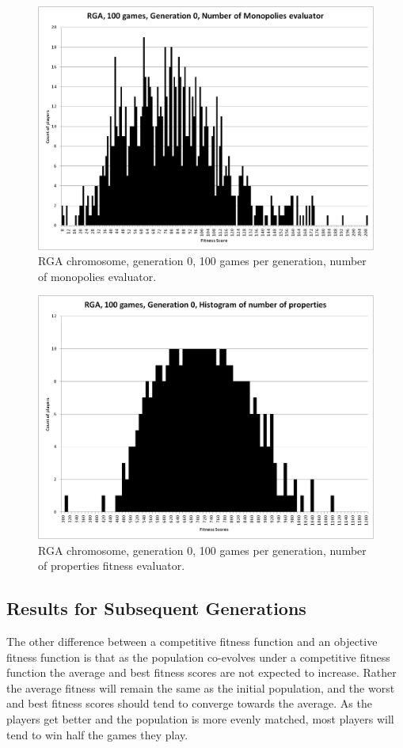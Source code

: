 \begin{figure}[htbp]
\centerline{\includegraphics[width=0.75\columnwidth]{Figures/RGA_1024_G000_N100_NM.png}}
\caption[RGA Fitness Distribution, Initial Generation]{RGA chromosome,
generation 0, 100 games per generation, number of monopolies evaluator.}
\label{figure-RGA-G000-N100-NM-initial_fitness}
\end{figure}

\begin{figure}[htbp]
\centerline{\includegraphics[width=0.75\columnwidth]{Figures/RGA_1024_G000_N100_NP.png}}
\caption[RGA Fitness Distribution, Initial Generation]{RGA chromosome,
generation 0, 100 games per generation, number of properties fitness evaluator.}
\label{figure-RGA-G000-N100-NP-initial_fitness}
\end{figure}

\subsection{Results for Subsequent Generations}

The other difference between a competitive fitness function and an objective
fitness function is that as the population co-evolves under a competitive
fitness function the average and best fitness scores are not expected to
increase. Rather the average fitness will remain the same as the initial
population, and the worst and best fitness scores should tend to converge
towards the average. As the players get better and the population is more evenly
matched, most players will tend to win half the games they play.

